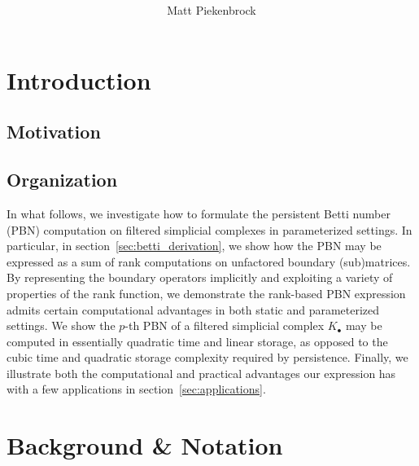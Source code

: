 \documentclass[10pt]{article}
\title{\vspace{-2.0em} \vspace{-0.5em}}
\author{Matt Piekenbrock}
\date{}
\newcommand{\+}{%
	\raisebox{0.18ex}{\scaleobj{0.55}{+}}
}
\theoremstyle{definition}
\begin{document}
\noindent



\section{Introduction}
\subsection*{Motivation}

%


\subsection{Organization}

In what follows, we investigate how to formulate the persistent Betti number (PBN) computation on filtered simplicial complexes in parameterized settings. 
In particular, in section~\ref{sec:betti_derivation}, we show how the PBN may be expressed as a sum of rank computations on unfactored boundary (sub)matrices. 
By representing the boundary operators implicitly and exploiting a variety of properties of the rank function, we demonstrate the rank-based PBN expression admits certain computational advantages in both static and parameterized settings. 
We show the $p$-th PBN of a filtered simplicial complex $K_\bullet$ may be computed in essentially quadratic time and linear storage, as opposed to the cubic time and quadratic storage complexity required by persistence.
Finally, we illustrate both the computational and practical advantages our expression has with a few applications in section~\ref{sec:applications}. 


\section{Background \& Notation}\label{sec:background_notation}

\end{document}
